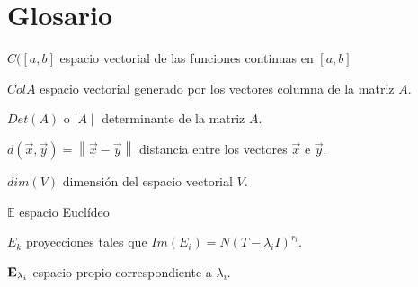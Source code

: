 \documentclass[a4paper,12pt,twopage]{book}
\begin{document}












\chapter*{Glosario}
$C([a,b]$  espacio vectorial de las funciones continuas en $[a,b]$ 

\vspace{0.2cm}

$Col A$  espacio vectorial generado por los vectores columna de la matriz $A$.

\vspace{0.2cm}

$Det(A)$  o $ \mid A \mid$ determinante de la matriz $A$.

\vspace{0.2cm}

$d(\vec{x},\vec{y})=\left\|\vec{x}-\vec{y}\right\|$  distancia entre los vectores $\vec{x}$ e $\vec{y}$.

\vspace{0.2cm}


$dim(V)$ dimensión del espacio vectorial $V$.

\vspace{0.2cm}

$\mathbb{E}$  espacio Euclídeo

\vspace{0.2cm}

$E_k$ proyecciones tales que $Im(E_i)=N(T- \lambda_i I)^{r_i}$.

\vspace{0.2cm}

$\bold E_{\lambda_i}$  espacio propio correspondiente a $\lambda_i$.

\vspace{0.2cm}
\end{document}
